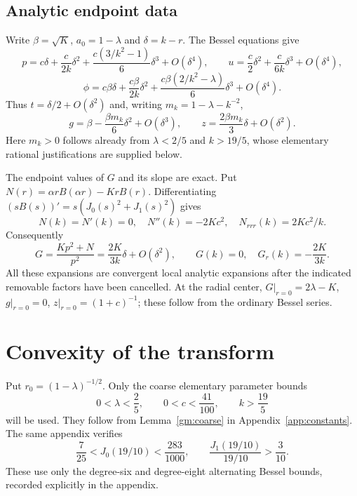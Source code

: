 \documentclass[11pt,letterpaper,reqno]{amsart}
\theoremstyle{definition}
\begin{document}
\subsection{Analytic endpoint data}\label{sec:endpoints}
Write $\beta=\sqrt K$, $a_0=1-\lambda$ and $\delta=k-r$.
The Bessel equations give
\[
 p=c\delta+\frac{c}{2k}\delta^2+
       \frac{c(3/k^2-1)}6\delta^3+O(\delta^4),\qquad
 u=\frac c2\delta^2+\frac{c}{6k}\delta^3+O(\delta^4),
\]
\[
 \phi=c\beta\delta+\frac{c\beta}{2k}\delta^2+
       \frac{c\beta(2/k^2-\lambda)}6\delta^3+O(\delta^4).
\]
Thus $t=\delta/2+O(\delta^2)$ and, writing $m_k=1-\lambda-k^{-2}$,
\[
 g=\beta-\frac{\beta m_k}{6}\delta^2+O(\delta^3),\qquad
 z=\frac{2\beta m_k}{3}\delta+O(\delta^2).
\]
Here $m_k>0$ follows already from $\lambda<2/5$ and $k>19/5$,
whose elementary rational justifications are supplied below.

The endpoint values of $G$ and its slope are exact. Put
$N(r)=\alpha rB(\alpha r)-KrB(r)$. Differentiating
$(sB(s))'=s(J_0(s)^2+J_1(s)^2)$ gives
\[
 N(k)=N'(k)=0,\quad N''(k)=-2Kc^2,
 \quad N_{rrr}(k)=2Kc^2/k.
\]
Consequently
\[
 G=\frac{Kp^2+N}{p^2}=\frac{2K}{3k}\delta+O(\delta^2),
 \qquad G(k)=0,\quad G_r(k)=-\frac{2K}{3k}.
\]
All these expansions are convergent local analytic expansions after
the indicated removable factors have been cancelled. At the radial center,
$G|_{r=0}=2\lambda-K$, $g|_{r=0}=0$, $z|_{r=0}=(1+c)^{-1}$; these follow
from the ordinary Bessel series.
\section{Convexity of the transform}\label{cv:sec:convexity}
Put $r_0=(1-\lambda)^{-1/2}$. Only the coarse elementary parameter bounds
\begin{equation}
 0<\lambda<\frac25,\qquad 0<c<\frac{41}{100},\qquad k>\frac{19}5
\end{equation}
will be used. They follow from Lemma~\ref{gm:coarse} in
Appendix~\ref{app:constants}. The same appendix verifies
\begin{equation}\label{cv:nineteen}
 \frac7{25}<J_0(19/10)<\frac{283}{1000},\qquad
 \frac{J_1(19/10)}{19/10}>\frac3{10}.
\end{equation}
These use only the degree-six and degree-eight alternating
Bessel bounds, recorded explicitly in the appendix.
\end{document}
